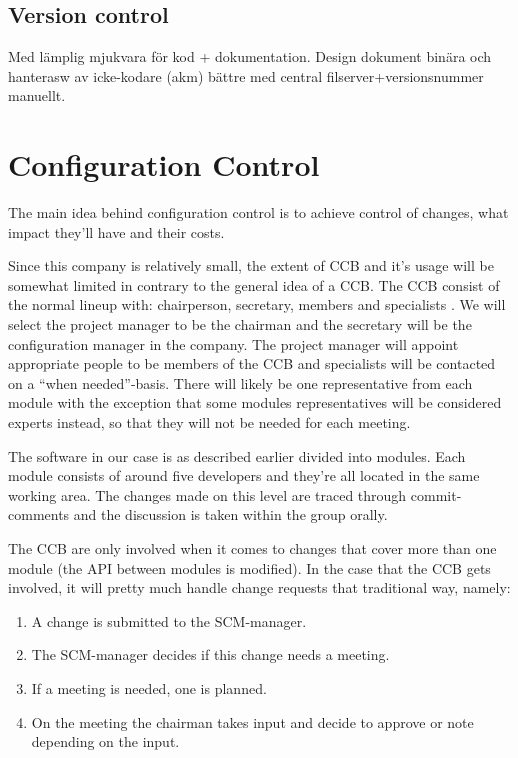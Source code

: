 \documentclass[a4paper,10pt]{article}
\begin{document}
\subsection{Version control}
Med lämplig mjukvara för kod + dokumentation.
Design dokument binära och hanterasw av icke-kodare (akm) bättre med central filserver+versionsnummer manuellt.



\section{Configuration Control}

The main idea behind configuration control is to achieve control of changes, what impact they'll have and their costs.

Since this company is relatively small, the extent of CCB and it's usage will be somewhat limited in contrary to the general idea of a CCB.
The CCB consist of the normal lineup with: chairperson, secretary, members and specialists \cite{daniels}. We will select the project manager
to be the chairman and the secretary will be the configuration manager in the company. The project manager will appoint appropriate people to be
members of the CCB and specialists will be contacted on a ``when needed''-basis. There will likely be one representative from each module with the exception
that some modules representatives will be considered experts instead, so that they will not be needed for each meeting.

The software in our case is as described earlier divided into modules. Each module consists of around five developers and they're all
located in the same working area. The changes made on this level are traced through commit-comments and the discussion is taken within
the group orally.

The CCB are only involved when it comes to changes that cover more than one module (the API between modules is modified).
In the case that the CCB gets involved, it will pretty much handle change requests that traditional way, namely:

\begin{enumerate}
 \item A change is submitted to the SCM-manager.
 \item The SCM-manager decides if this change needs a meeting.
 \item If a meeting is needed, one is planned.
 \item On the meeting the chairman takes input and decide to approve or note depending on the input.
\end{enumerate}
\end{document}
